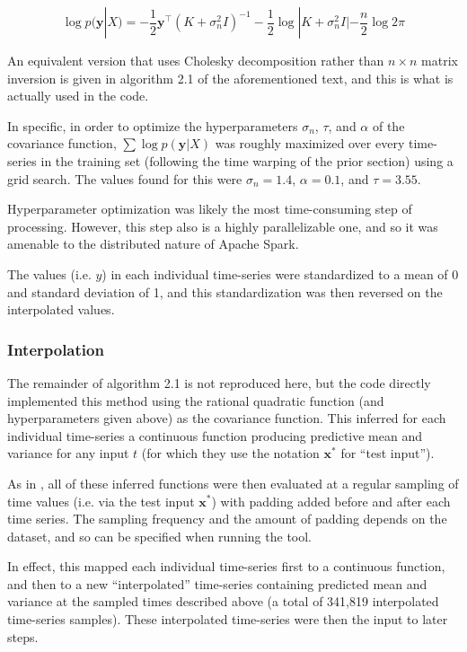 \documentclass[journal]{IEEEtran}
\begin{document}
$$\log p(\mathbf{y}|X) = -\frac{1}{2}\mathbf{y}^\top(K+\sigma_n^2I)^{-1}-\frac{1}{2}\log |K+\sigma_n^2I|-\frac{n}{2}\log2\pi$$

An equivalent version that uses Cholesky decomposition rather than
$n\times n$ matrix inversion is given in algorithm 2.1 of the
aforementioned text, and this is what is actually used in the code.

In specific, in order to optimize the hyperparameters $\sigma_n$,
$\tau$, and $\alpha$ of the covariance function, $\sum\log
p(\mathbf{y}|X)$ was roughly maximized over every time-series in the
training set (following the time warping of the prior section) using a
grid search.  The values found for this were $\sigma_n=1.4$,
$\alpha=0.1$, and $\tau=3.55$.

Hyperparameter optimization was likely the most time-consuming step of
processing.  However, this step also is a highly parallelizable one,
and so it was amenable to the distributed nature of Apache Spark.

The values (i.e. $y$) in each individual time-series were standardized
to a mean of 0 and standard deviation of 1, and this standardization
was then reversed on the interpolated values.


\subsubsection{Interpolation}

The remainder of algorithm 2.1 is not reproduced here, but the code
directly implemented this method using the rational quadratic function
(and hyperparameters given above) as the covariance function.  This
inferred for each individual time-series a continuous function
producing predictive mean and variance for any input $t$ (for which
they use the notation $\mathbf{x^*}$ for ``test input'').

As in \cite{Lasko2013}, all of these inferred functions were then
evaluated at a regular sampling of time values (i.e. via the test
input $\mathbf{x^*}$) with padding added before and after each time
series.  The sampling frequency and the amount of padding depends on
the dataset, and so can be specified when running the tool.

In effect, this mapped each individual time-series first to a
continuous function, and then to a new ``interpolated'' time-series
containing predicted mean and variance at the sampled times described
above (a total of 341,819 interpolated time-series samples).  These
interpolated time-series were then the input to later steps.
\end{document}
